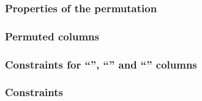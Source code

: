 \subsubsection{Properties of the permutation}                                                               \label{hub: consistencies: storage: permutation}        
\subsubsection{Permuted columns                                                             \lispDone{}}    \label{hub: consistencies: storage: columns}            
\subsubsection{Constraints for ``'', ``'' and ``'' columns \lispDone{}}    \label{hub: consistencies: storage: first again final}  
\subsubsection{Constraints                                                                  \lispDone{}}    \label{hub: consistencies: storage: constraints}        
